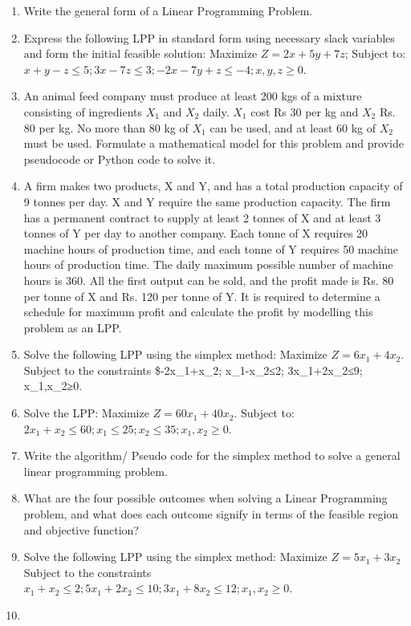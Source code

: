 \documentclass[
  letterpaper,
  DIV=11,
  numbers=noendperiod]{scrreprt}
\begin{document}
\begin{enumerate}
\def\labelenumi{\arabic{enumi}.}
\item
  Write the general form of a Linear Programming Problem.
\item
  Express the following LPP in standard form using necessary slack
  variables and form the initial feasible solution: Maximize
  \(Z=2x+5y+7z\); Subject to:
  \(x+y-z\le 5;3x-7z\le 3; -2x-7y+z\le -4;x,y,z\ge 0\).
\item
  An animal feed company must produce at least 200 kgs of a mixture
  consisting of ingredients \(X_1\) and \(X_2\) daily. \(X_1\) cost Rs
  30 per kg and \(X_2\) Rs. 80 per kg. No more than 80 kg of \(X_1\) can
  be used, and at least 60 kg of \(X_2\) must be used. Formulate a
  mathematical model for this problem and provide pseudocode or Python
  code to solve it.
\item
  A firm makes two products, X and Y, and has a total production
  capacity of 9 tonnes per day. X and Y require the same production
  capacity. The firm has a permanent contract to supply at least 2
  tonnes of X and at least 3 tonnes of Y per day to another company.
  Each tonne of X requires 20 machine hours of production time, and each
  tonne of Y requires 50 machine hours of production time. The daily
  maximum possible number of machine hours is 360. All the first output
  can be sold, and the profit made is Rs. 80 per tonne of X and Rs. 120
  per tonne of Y. It is required to determine a schedule for maximum
  profit and calculate the profit by modelling this problem as an LPP.
\item
  Solve the following LPP using the simplex method: Maximize
  \(Z=6x_1+4x_2\). Subject to the constraints \$-2x\_1+x\_2;
  x\_1-x\_2≤2; 3x\_1+2x\_2≤9; x\_1,x\_2≥0.
\item
  Solve the LPP: Maximize \(Z=60x_1+40x_2\). Subject to:
  \(2x_1+x_2\le 60;x_1\le 25;x_2\le 35;x_1,x_2\ge 0\).
\item
  Write the algorithm/ Pseudo code for the simplex method to solve a
  general linear programming problem.
\item
  What are the four possible outcomes when solving a Linear Programming
  problem, and what does each outcome signify in terms of the feasible
  region and objective function?
\item
  Solve the following LPP using the simplex method: Maximize
  \(Z=5x_1+3x_2\) Subject to the constraints
  \(x_1+x_2\le 2; 5x_1+2x_2\le 10; 3x_1+8x_2\le 12; x_1,x_2\ge 0\).
\item

\end{enumerate}
\end{document}
